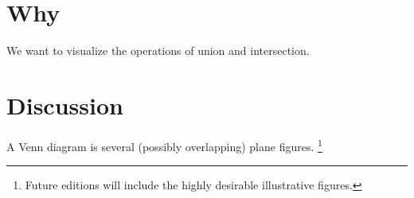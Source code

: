 
\section*{Why}

We want to visualize the operations of union and intersection.

\section*{Discussion}

A Venn diagram is several (possibly overlapping) plane figures.
    \ifhmode\unskip\fi\footnote{
Future editions will include the highly desirable illustrative figures.
    }

\blankpage